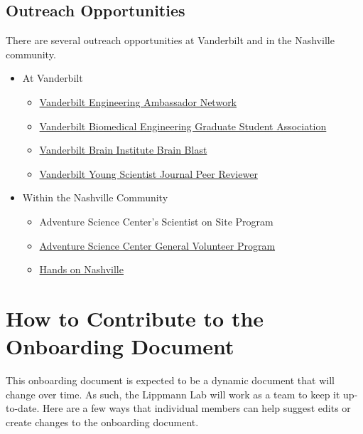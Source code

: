 \documentclass[
]{book}
\providecommand{\tightlist}{%
  \setlength{\itemsep}{0pt}\setlength{\parskip}{0pt}}
\begin{document}
\hypertarget{outreach-opportunities}{%
\section{Outreach Opportunities}\label{outreach-opportunities}}

There are several outreach opportunities at Vanderbilt and in the Nashville community.

\begin{itemize}
\tightlist
\item
  At Vanderbilt

  \begin{itemize}
  \tightlist
  \item
    \href{https://anchorlink.vanderbilt.edu/organization/EAN}{Vanderbilt Engineering Ambassador Network}
  \item
    \href{https://anchorlink.vanderbilt.edu/organization/bme_gsa}{Vanderbilt Biomedical Engineering Graduate Student Association}
  \item
    \href{https://medschool.vanderbilt.edu/brain-institute/new-vbi-homepage-inprogress/outreach/}{Vanderbilt Brain Institute Brain Blast}
  \item
    \href{https://www.youngscientistjournal.org/}{Vanderbilt Young Scientist Journal Peer Reviewer}
  \end{itemize}
\item
  Within the Nashville Community

  \begin{itemize}
  \tightlist
  \item
    Adventure Science Center's Scientist on Site Program
  \item
    \href{https://www.adventuresci.org/volunteer}{Adventure Science Center General Volunteer Program}
  \item
    \href{https://www.hon.org/?layoutViewMode=tablet}{Hands on Nashville}
  \end{itemize}
\end{itemize}

\hypertarget{contribute}{%
\chapter{How to Contribute to the Onboarding Document}\label{contribute}}

This onboarding document is expected to be a dynamic document that will change over time. As such, the Lippmann Lab will work as a team to keep it up-to-date. Here are a few ways that individual members can help suggest edits or create changes to the onboarding document.
\end{document}
